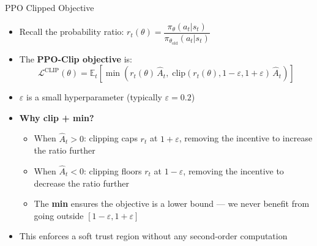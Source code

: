 \begin{frame}{PPO Clipped Objective}
\begin{itemize}
    \item Recall the probability ratio: $r_t(\theta) = \dfrac{\pi_\theta(a_t|s_t)}{\pi_{\theta_\text{old}}(a_t|s_t)}$
    \item The \textbf{PPO-Clip objective} is:
    $$\mathcal{L}^{\mathrm{CLIP}}(\theta) = \mathbb{E}_t\!\left[ \min\!\left( r_t(\theta)\,\hat{A}_t,\; \mathrm{clip}(r_t(\theta), 1-\varepsilon, 1+\varepsilon)\,\hat{A}_t \right) \right]$$
    \item $\varepsilon$ is a small hyperparameter (typically $\varepsilon = 0.2$)
    \pause
    \item \textbf{Why clip + min?}
    \begin{itemize}
        \item When $\hat{A}_t > 0$: clipping caps $r_t$ at $1+\varepsilon$, removing the incentive to increase the ratio further
        \item When $\hat{A}_t < 0$: clipping floors $r_t$ at $1-\varepsilon$, removing the incentive to decrease the ratio further
        \item The \textbf{min} ensures the objective is a lower bound --- we never benefit from going outside $[1-\varepsilon, 1+\varepsilon]$
    \end{itemize}
    \item This enforces a soft trust region without any second-order computation
\end{itemize}
\end{frame}

